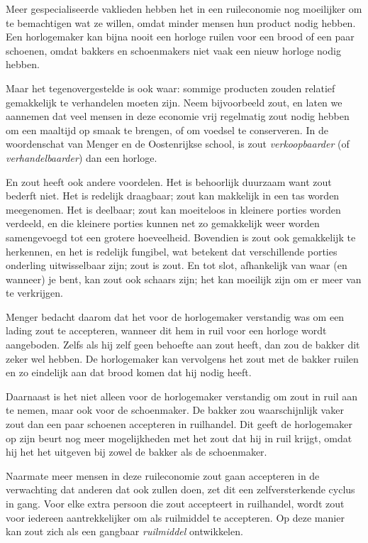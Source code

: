\documentclass[
  a5paper,
  smalldemyvopaper,11pt,twoside,onecolumn,openright,extrafontsizes,
hidelinks]{memoir}
\begin{document}
Meer gespecialiseerde vaklieden hebben het in een ruileconomie nog
moeilijker om te bemachtigen wat ze willen, omdat minder mensen hun
product nodig hebben. Een horlogemaker kan bijna nooit een horloge
ruilen voor een brood of een paar schoenen, omdat bakkers en
schoenmakers niet vaak een nieuw horloge nodig hebben.

Maar het tegenovergestelde is ook waar: sommige producten zouden
relatief gemakkelijk te verhandelen moeten zijn. Neem bijvoorbeeld zout,
en laten we aannemen dat veel mensen in deze economie vrij regelmatig
zout nodig hebben om een maaltijd op smaak te brengen, of om voedsel te
conserveren. In de woordenschat van Menger en de Oostenrijkse school, is
zout \emph{verkoopbaarder} (of \emph{verhandelbaarder}) dan een horloge.

En zout heeft ook andere voordelen. Het is behoorlijk duurzaam want zout
bederft niet. Het is redelijk draagbaar; zout kan makkelijk in een tas
worden meegenomen. Het is deelbaar; zout kan moeiteloos in kleinere
porties worden verdeeld, en die kleinere porties kunnen net zo
gemakkelijk weer worden samengevoegd tot een grotere hoeveelheid.
Bovendien is zout ook gemakkelijk te herkennen, en het is redelijk
fungibel, wat betekent dat verschillende porties onderling uitwisselbaar
zijn; zout is zout. En tot slot, afhankelijk van waar (en wanneer) je
bent, kan zout ook schaars zijn; het kan moeilijk zijn om er meer van te
verkrijgen.

Menger bedacht daarom dat het voor de horlogemaker verstandig was om een
lading zout te accepteren, wanneer dit hem in ruil voor een horloge
wordt aangeboden. Zelfs als hij zelf geen behoefte aan zout heeft, dan
zou de bakker dit zeker wel hebben. De horlogemaker kan vervolgens het
zout met de bakker ruilen en zo eindelijk aan dat brood komen dat hij
nodig heeft.

Daarnaast is het niet alleen voor de horlogemaker verstandig om zout in
ruil aan te nemen, maar ook voor de schoenmaker. De bakker zou
waarschijnlijk vaker zout dan een paar schoenen accepteren in
ruilhandel. Dit geeft de horlogemaker op zijn beurt nog meer
mogelijkheden met het zout dat hij in ruil krijgt, omdat hij het het
uitgeven bij zowel de bakker als de schoenmaker.

Naarmate meer mensen in deze ruileconomie zout gaan accepteren in de
verwachting dat anderen dat ook zullen doen, zet dit een
zelfversterkende cyclus in gang. Voor elke extra persoon die zout
accepteert in ruilhandel, wordt zout voor iedereen aantrekkelijker om
als ruilmiddel te accepteren. Op deze manier kan zout zich als een
gangbaar \emph{ruilmiddel} ontwikkelen.
\end{document}
